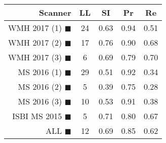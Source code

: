 \begin{tabular}{rcccc}
\toprule
Scanner & LL & SI & Pr & Re \\
\midrule
WMH 2017 (1) {\color[rgb]{ 1.00 0.00 0.00}$\blacksquare$} & 24 & 0.63 & 0.94 & 0.51 \\
WMH 2017 (2) {\color[rgb]{ 1.00 0.50 0.00}$\blacksquare$} & 17 & 0.76 & 0.90 & 0.68 \\
WMH 2017 (3) {\color[rgb]{ 1.00 0.80 0.00}$\blacksquare$} & 6 & 0.69 & 0.79 & 0.70 \\
MS  2016 (1) {\color[rgb]{ 0.20 0.80 0.00}$\blacksquare$} & 29 & 0.51 & 0.92 & 0.34 \\
MS  2016 (2) {\color[rgb]{ 0.00 0.40 1.00}$\blacksquare$} & 5 & 0.39 & 0.75 & 0.28 \\
MS  2016 (3) {\color[rgb]{ 0.60 0.00 1.00}$\blacksquare$} & 10 & 0.53 & 0.91 & 0.38 \\
ISBI MS 2015 {\color[rgb]{ 1.00 0.00 1.00}$\blacksquare$} & 5 & 0.71 & 0.80 & 0.67 \\
\midrule
ALL {\color[rgb]{ 1.00 1.00 1.00}$\blacksquare$} & 12 & 0.69 & 0.85 & 0.62 \\
\bottomrule
\end{tabular}